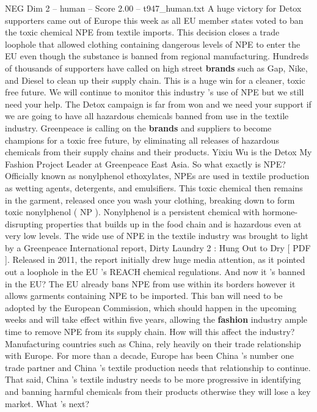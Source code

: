 \begin{textsample}{NEG Dim 2 – human – Score 2.00 – t947\_human.txt}  \label{ex:f2_neg_037}
A huge victory for Detox supporters came out of Europe this week as all EU member states voted to ban the toxic chemical NPE from textile imports.
This decision closes a trade loophole that allowed clothing containing dangerous levels of NPE to enter the EU even though the substance is banned from regional manufacturing.
Hundreds of thousands of supporters have called on high street \textbf{brands} such as Gap, Nike, and Diesel to clean up their supply chain.
This is a huge win for a cleaner, toxic free future.
We will continue to monitor this industry ’s use of NPE but we still need your help.
The Detox campaign is far from won and we need your support if we are going to have all hazardous chemicals banned from use in the textile industry.
Greenpeace is calling on the \textbf{brands} and suppliers to become champions for a toxic free future, by eliminating all releases of hazardous chemicals from their supply chains and their products.
Yixiu Wu is the Detox My Fashion Project Leader at Greenpeace East Asia.
So what exactly is NPE?
Officially known as nonylphenol ethoxylates, NPEs are used in textile production as wetting agents, detergents, and emulsifiers.
This toxic chemical then remains in the garment, released once you wash your clothing, breaking down to form toxic nonylphenol ( NP ).
Nonylphenol is a persistent chemical with hormone-disrupting properties that builds up in the food chain and is hazardous even at very low levels.
The wide use of NPE in the textile industry was brought to light by a Greenpeace International report, Dirty Laundry 2 : Hung Out to Dry [ PDF ].
Released in 2011, the report initially drew huge media attention, as it pointed out a loophole in the EU ’s REACH chemical regulations.
And now it ’s banned in the EU?
The EU already bans NPE from use within its borders however it allows garments containing NPE to be imported.
This ban will need to be adopted by the European Commission, which should happen in the upcoming weeks and will take effect within five years, allowing the \textbf{fashion} industry ample time to remove NPE from its supply chain.
How will this affect the industry?
Manufacturing countries such as China, rely heavily on their trade relationship with Europe.
For more than a decade, Europe has been China ’s number one trade partner and China ’s textile production needs that relationship to continue.
That said, China ’s textile industry needs to be more progressive in identifying and banning harmful chemicals from their products otherwise they will lose a key market.
What ’s next?

\end{textsample}
